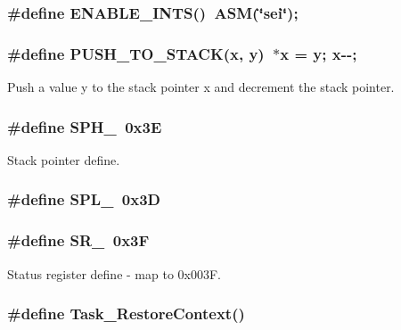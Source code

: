 \subsubsection[{ENABLE\_\-INTS}]{\setlength{\rightskip}{0pt plus 5cm}\#define ENABLE\_\-INTS()~ASM(\char`\"{}sei\char`\"{});}\label{taskport_8h_a2cb01cf0d805af90a997638bfb514428}
\subsubsection[{PUSH\_\-TO\_\-STACK}]{\setlength{\rightskip}{0pt plus 5cm}\#define PUSH\_\-TO\_\-STACK(x, \/  y)~$\ast$x = y; x-\/-\/;}\label{taskport_8h_a15c68cf3ebfae7f24ef7bc0e20010fc7}


Push a value y to the stack pointer x and decrement the stack pointer. 
\subsubsection[{SPH\_\-}]{\setlength{\rightskip}{0pt plus 5cm}\#define SPH\_\-~0x3E}\label{taskport_8h_a2f0c1118a6d5b5be00896f34e9efb714}


Stack pointer define. 
\subsubsection[{SPL\_\-}]{\setlength{\rightskip}{0pt plus 5cm}\#define SPL\_\-~0x3D}\label{taskport_8h_a473d8fd4862f8f0be8c4edde634dbf22}
\subsubsection[{SR\_\-}]{\setlength{\rightskip}{0pt plus 5cm}\#define SR\_\-~0x3F}\label{taskport_8h_a07a145779d94a87fd61fa06a5e75ba37}


Status register define -\/ map to 0x003F. 
\subsubsection[{Task\_\-RestoreContext}]{\setlength{\rightskip}{0pt plus 5cm}\#define Task\_\-RestoreContext()}\label{taskport_8h_aed9880d825c1cbd98233e9ec6a05c794}


